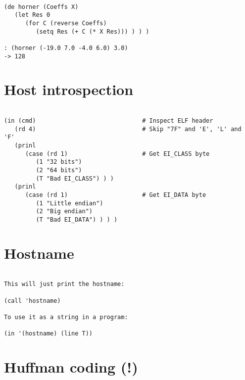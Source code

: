 \begin{verbatim}

(de horner (Coeffs X)
   (let Res 0
      (for C (reverse Coeffs)
         (setq Res (+ C (* X Res))) ) ) )

: (horner (-19.0 7.0 -4.0 6.0) 3.0)
-> 128

\end{verbatim}

\section*{Host introspection}

\begin{verbatim}

(in (cmd)                              # Inspect ELF header
   (rd 4)                              # Skip "7F" and 'E', 'L' and 'F'
   (prinl
      (case (rd 1)                     # Get EI_CLASS byte
         (1 "32 bits")
         (2 "64 bits")
         (T "Bad EI_CLASS") ) )
   (prinl
      (case (rd 1)                     # Get EI_DATA byte
         (1 "Little endian")
         (2 "Big endian")
         (T "Bad EI_DATA") ) ) )

\end{verbatim}

\section*{Hostname}

\begin{verbatim}

This will just print the hostname:

(call 'hostname)

To use it as a string in a program:

(in '(hostname) (line T))

\end{verbatim}

\section*{Huffman coding (!)}

